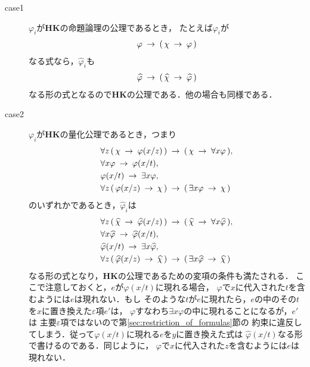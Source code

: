 	\begin{metaprf}\mbox{}
		\begin{description}
			\item[case1] $\varphi_{i}$が{\bf HK}の命題論理の公理であるとき，
				たとえば$\varphi_{i}$が
				\begin{align}
					\varphi \hspace{0.25em}\rightarrow\hspace{0.25em} (\, \chi \hspace{0.25em}\rightarrow\hspace{0.25em} \varphi\, )
				\end{align}
				なる式なら，$\widehat{\varphi}_{i}$も
				\begin{align}
					\widehat{\varphi} \hspace{0.25em}\rightarrow\hspace{0.25em} 
					(\, \widehat{\chi} \hspace{0.25em}\rightarrow\hspace{0.25em} \widehat{\varphi}\, )
				\end{align}
				なる形の式となるので{\bf HK}の公理である．他の場合も同様である．
				
			\item[case2] $\varphi_{i}$が{\bf HK}の量化公理であるとき，つまり
				\begin{align}
					&\forall z\, (\, \chi \hspace{0.25em}\rightarrow\hspace{0.25em} \varphi(x/z)\, ) 
						\hspace{0.25em}\rightarrow\hspace{0.25em} (\, \chi \hspace{0.25em}\rightarrow\hspace{0.25em} \forall x \varphi\, ), \\
					&\forall x \varphi \hspace{0.25em}\rightarrow\hspace{0.25em} \varphi(x/t), \\
					&\varphi(x/t) \hspace{0.25em}\rightarrow\hspace{0.25em} \exists x \varphi, \\
					&\forall z\, (\, \varphi(x/z) \hspace{0.25em}\rightarrow\hspace{0.25em} \chi\, )
						\hspace{0.25em}\rightarrow\hspace{0.25em} (\, \exists x \varphi \hspace{0.25em}\rightarrow\hspace{0.25em} \chi\, )
				\end{align}
				のいずれかであるとき，$\widehat{\varphi}_{i}$は
				\begin{align}
					&\forall z\, (\, \widehat{\chi} \hspace{0.25em}\rightarrow\hspace{0.25em} \widehat{\varphi}(x/z)\, ) 
						\hspace{0.25em}\rightarrow\hspace{0.25em} (\, \widehat{\chi} \hspace{0.25em}\rightarrow\hspace{0.25em} \forall x \widehat{\varphi}\, ), \\
					&\forall x \widehat{\varphi} \hspace{0.25em}\rightarrow\hspace{0.25em} \widehat{\varphi}(x/t), \\
					&\widehat{\varphi}(x/t) \hspace{0.25em}\rightarrow\hspace{0.25em} \exists x \widehat{\varphi}, \\
					&\forall z\, (\, \widehat{\varphi}(x/z) \hspace{0.25em}\rightarrow\hspace{0.25em} \widehat{\chi}\, )
						\hspace{0.25em}\rightarrow\hspace{0.25em} (\, \exists x \widehat{\varphi} \hspace{0.25em}\rightarrow\hspace{0.25em} \widehat{\chi}\, )
				\end{align}
				なる形の式となり，{\bf HK}の公理であるための変項の条件も満たされる．
				ここで注意しておくと，$e$が$\varphi(x/t)$に現れる場合，
				$\varphi$で$x$に代入された$t$を含むようには$e$は現れない．もし
				そのような$t$が$e$に現れたら，$e$の中のその$t$を$x$に置き換えた$\varepsilon$項$e'$は，
				$\varphi$すなわち$\exists x \varphi$の中に現れることになるが，$e'$は
				主要$\varepsilon$項ではないので第\ref{sec:restriction_of_formulas}節の
				約束に違反してしまう．従って$\varphi(x/t)$に現れる$e$を$y$に置き換えた式は
				$\widehat{\varphi}(x/t)$なる形で書けるのである．同じように，
				$\varphi$で$x$に代入された$z$を含むようには$e$は現れない．
				

\end{description}
\end{metaprf}
